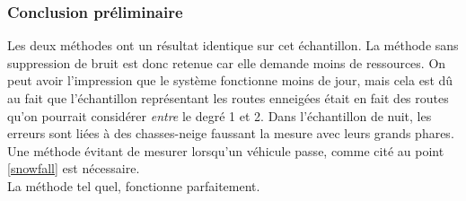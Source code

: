\subsubsection{Conclusion préliminaire}
Les deux méthodes ont un résultat identique sur cet échantillon. La méthode sans suppression de bruit est donc
retenue car elle demande moins de ressources.
On peut avoir l'impression que le système fonctionne moins de jour, mais cela est dû au fait que l'échantillon
représentant les routes enneigées était en fait des routes qu'on pourrait considérer \emph{entre} le degré 1 et 2.
Dans l'échantillon de nuit, les erreurs sont liées à des chasses-neige faussant la mesure avec leurs grands phares.
Une méthode évitant de mesurer lorsqu'un véhicule passe, comme cité au point \ref{snowfall} est nécessaire.\\
La méthode tel quel, fonctionne parfaitement.